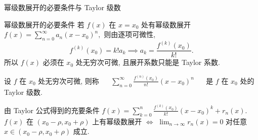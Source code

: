 \begin{frame}{幂级数展开的必要条件与 Taylor 级数}

\begin{block}{幂级数展开的必要条件}
若 $f(x)$ 在 $x = x_0$ 处有幂级数展开 $f(x) = \sum_{n=0}^\infty a_n (x-x_0)^n,$ 则由逐项可微性,
\[f^{(k)}(x_0) = k! a_k \implies a_k = \frac{f^{(k)}(x_0)}{k!}.\]
所以 $f(x)$ 必须在 $x_0$ 处{\color{red}无穷次可微}, 且展开系数只能是 Taylor 系数.
\end{block}

\pause

\begin{Def}[Taylor 级数]
设 $f$ 在 $x_0$ 处无穷次可微, 则称 ~~ $\sum_{n=0}^\infty \frac{f^{(n)}(x_0)}{n!} (x - x_0)^n$ ~~ 是 $f$ 在 $x_0$ 处的 {\color{red}Taylor 级数}.
\end{Def}

\pause

\begin{block}{由 Taylor 公式得到的充要条件}
$f(x) = \sum_{k=0}^n \frac{f^{(k)}(x_0)}{k!} (x-x_0)^k + r_n(x).$
$f(x)$ 在 $(x_0-\rho, x_0+\rho)$ 上有幂级数展开 $\Longleftrightarrow$ $\lim_{n\to\infty} r_n(x) = 0$ 对任意 $x \in (x_0-\rho, x_0+\rho)$ 成立.
\end{block}

\end{frame}


